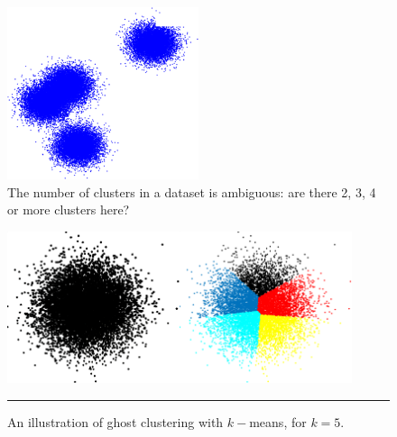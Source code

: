 \begin{figure}[!t]
\centering
\includegraphics[width=0.5\textwidth]{images/DSML/clustering9.png}  \caption[\small Ambiguous number of clusters]{\small The number of clusters in a dataset is ambiguous: are there 2, 3, 4 or more clusters here?}\label{fig:clust9}
\end{figure}
\afterpage{\FloatBarrier}
\begin{figure}[!t]
\centering
\includegraphics[width=0.45\textwidth]{images/DSML/clustering10.png}\quad \includegraphics[width=0.45\textwidth]{images/DSML/clustering11.png}  \caption[\small An illustration of ghost clustering with $k-$means]{\small An illustration of ghost clustering with $k-$means, for $k=5$.}\hrule\label{fig:clust1011}
\end{figure}
\afterpage{\FloatBarrier}

